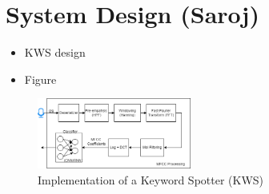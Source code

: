 \section{System Design (Saroj)}
\label{sec:system_design}
\begin{itemize}
    \item KWS design
    \item Figure
\end{itemize}

\begin{figure}[htbp]	
    \includegraphics[width=0.45\textwidth]{figs/KWS-architecture.png}
    \caption{Implementation of a Keyword Spotter (KWS)}
    \label{fig:KWS_Arch}
\end{figure}

